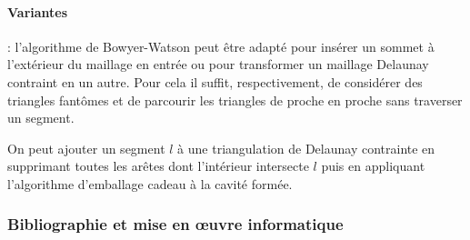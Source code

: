 \documentclass[12pt,a4paper]{report}
\begin{document}
\paragraph{Variantes} : l'algorithme de Bowyer-Watson peut être adapté pour insérer un sommet à l'extérieur du maillage en entrée ou pour transformer un maillage Delaunay contraint en un autre. Pour cela il suffit, respectivement, de considérer des triangles \og fantômes \fg{} et de parcourir les triangles de proche en proche sans traverser un segment.

On peut ajouter un segment $l$ à une triangulation de Delaunay contrainte en supprimant toutes les arêtes dont l'intérieur intersecte $l$ puis en appliquant l'algorithme d'emballage cadeau à la cavité formée.

\subsubsection{Bibliographie et mise en \oe{}uvre informatique}
\end{document}
